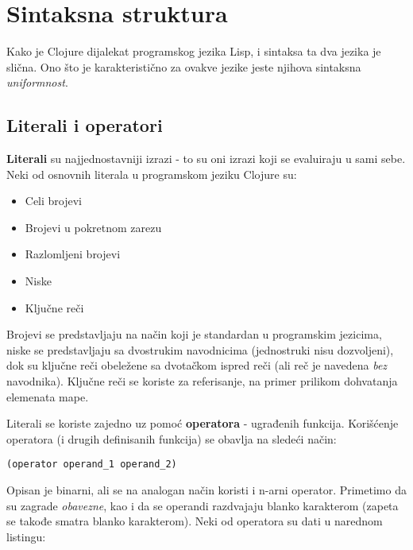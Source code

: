 \section{Sintaksna struktura}
\label{sec:sintaksnastruktura}

Kako je Clojure dijalekat programskog jezika Lisp, i sintaksa ta dva jezika je slična. Ono što je karakteristično za ovakve jezike jeste njihova sintaksna \emph{uniformnost}.

\subsection{Literali i operatori}
\label{subsec:literalioperatori}



\textbf{Literali} su najjednostavniji izrazi - to su oni izrazi koji se evaluiraju u sami sebe. Neki od osnovnih literala u programskom jeziku Clojure su:

\begin{itemize}
    \item Celi brojevi
    \item Brojevi u pokretnom zarezu
    \item Razlomljeni brojevi
    \item Niske
    \item Ključne reči
\end{itemize}

Brojevi se predstavljaju na način koji je standardan u programskim jezicima, niske se predstavljaju sa dvostrukim navodnicima (jednostruki nisu dozvoljeni), dok su ključne reči obeležene sa dvotačkom ispred reči (ali reč je navedena \emph{bez} navodnika).
Ključne reči se koriste za referisanje, na primer prilikom dohvatanja elemenata mape.

Literali se koriste zajedno uz pomoć \textbf{operatora} - ugrađenih funkcija. Korišćenje operatora (i drugih definisanih funkcija) se obavlja na sledeći način:

\begin{verbatim}
(operator operand_1 operand_2)
\end{verbatim}

Opisan je binarni, ali se na analogan način koristi i n-arni operator. Primetimo da su zagrade \emph{obavezne}, kao i da se operandi razdvajaju blanko karakterom (zapeta se takođe smatra blanko karakterom). Neki od operatora su dati u narednom listingu:

